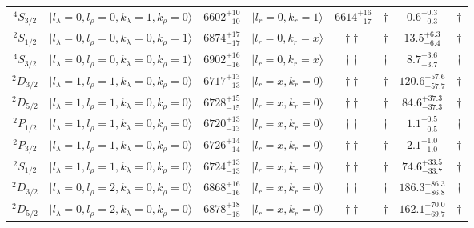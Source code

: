 \begin{tabular}{c| c c c c c c c}
$^{4}S_{3/2}$ & $\vert l_{\lambda}\!\!=\!0, l_{\rho}\!\!=\!0, k_{\lambda}\!\!=\!1, k_{\rho}\!\!=\!0 \rangle$ & $6602^{+10}_{-10}$ & $\vert l_r\!\!=\!0, k_r\!\!=\!1 \rangle$ & $6614^{+16}_{-17}$ & $\dagger$ & $0.6^{+0.3}_{-0.3}$ & $\dagger$ \\ 
$^{2}S_{1/2}$ & $\vert l_{\lambda}\!\!=\!0, l_{\rho}\!\!=\!0, k_{\lambda}\!\!=\!0, k_{\rho}\!\!=\!1 \rangle$ & $6874^{+17}_{-17}$ & $\vert l_r\!\!=\!0, k_r\!\!=\!x \rangle$ & $\dagger\dagger$ & $\dagger$ & $13.5^{+6.3}_{-6.4}$ & $\dagger$ \\ 
$^{4}S_{3/2}$ & $\vert l_{\lambda}\!\!=\!0, l_{\rho}\!\!=\!0, k_{\lambda}\!\!=\!0, k_{\rho}\!\!=\!1 \rangle$ & $6902^{+16}_{-16}$ & $\vert l_r\!\!=\!0, k_r\!\!=\!x \rangle$ & $\dagger\dagger$ & $\dagger$ & $8.7^{+3.6}_{-3.7}$ & $\dagger$ \\ 
$^{2}D_{3/2}$ & $\vert l_{\lambda}\!\!=\!1, l_{\rho}\!\!=\!1, k_{\lambda}\!\!=\!0, k_{\rho}\!\!=\!0 \rangle$ & $6717^{+13}_{-13}$ & $\vert l_r\!\!=\!x, k_r\!\!=\!0 \rangle$ & $\dagger\dagger$ & $\dagger$ & $120.6^{+57.6}_{-57.7}$ & $\dagger$ \\ 
$^{2}D_{5/2}$ & $\vert l_{\lambda}\!\!=\!1, l_{\rho}\!\!=\!1, k_{\lambda}\!\!=\!0, k_{\rho}\!\!=\!0 \rangle$ & $6728^{+15}_{-15}$ & $\vert l_r\!\!=\!x, k_r\!\!=\!0 \rangle$ & $\dagger\dagger$ & $\dagger$ & $84.6^{+37.3}_{-37.3}$ & $\dagger$ \\ 
$^{2}P_{1/2}$ & $\vert l_{\lambda}\!\!=\!1, l_{\rho}\!\!=\!1, k_{\lambda}\!\!=\!0, k_{\rho}\!\!=\!0 \rangle$ & $6720^{+13}_{-13}$ & $\vert l_r\!\!=\!x, k_r\!\!=\!0 \rangle$ & $\dagger\dagger$ & $\dagger$ & $1.1^{+0.5}_{-0.5}$ & $\dagger$ \\ 
$^{2}P_{3/2}$ & $\vert l_{\lambda}\!\!=\!1, l_{\rho}\!\!=\!1, k_{\lambda}\!\!=\!0, k_{\rho}\!\!=\!0 \rangle$ & $6726^{+14}_{-14}$ & $\vert l_r\!\!=\!x, k_r\!\!=\!0 \rangle$ & $\dagger\dagger$ & $\dagger$ & $2.1^{+1.0}_{-1.0}$ & $\dagger$ \\ 
$^{2}S_{1/2}$ & $\vert l_{\lambda}\!\!=\!1, l_{\rho}\!\!=\!1, k_{\lambda}\!\!=\!0, k_{\rho}\!\!=\!0 \rangle$ & $6724^{+13}_{-13}$ & $\vert l_r\!\!=\!x, k_r\!\!=\!0 \rangle$ & $\dagger\dagger$ & $\dagger$ & $74.6^{+33.5}_{-33.7}$ & $\dagger$ \\ 
$^{2}D_{3/2}$ & $\vert l_{\lambda}\!\!=\!0, l_{\rho}\!\!=\!2, k_{\lambda}\!\!=\!0, k_{\rho}\!\!=\!0 \rangle$ & $6868^{+16}_{-16}$ & $\vert l_r\!\!=\!x, k_r\!\!=\!0 \rangle$ & $\dagger\dagger$ & $\dagger$ & $186.3^{+86.3}_{-86.8}$ & $\dagger$ \\ 
$^{2}D_{5/2}$ & $\vert l_{\lambda}\!\!=\!0, l_{\rho}\!\!=\!2, k_{\lambda}\!\!=\!0, k_{\rho}\!\!=\!0 \rangle$ & $6878^{+18}_{-18}$ & $\vert l_r\!\!=\!x, k_r\!\!=\!0 \rangle$ & $\dagger\dagger$ & $\dagger$ & $162.1^{+70.0}_{-69.7}$ & $\dagger$ \\ 

\end{tabular}
